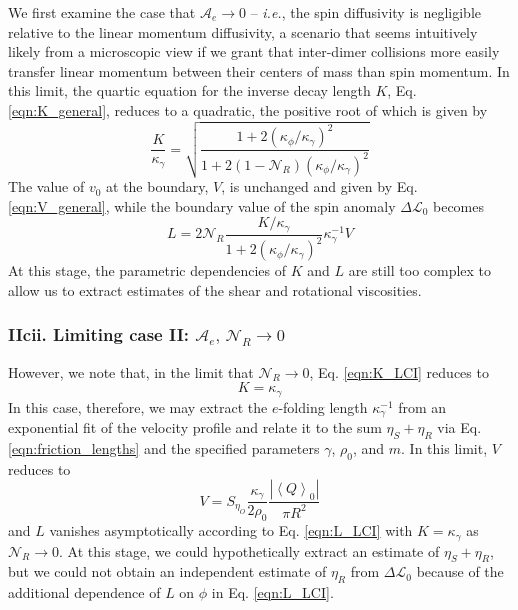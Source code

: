 \documentclass[%
 reprint,
superscriptaddress,
longbibliography,
 amsmath,amssymb,
 prl,
 citeautoscript,
]{revtex4-1}
\begin{document}
We first examine the case that $\mathcal{A}_e \longrightarrow 0$ -- {\it i.e.}, the spin diffusivity is negligible relative to the linear momentum diffusivity, a scenario that seems intuitively likely from a microscopic view if we grant that inter-dimer collisions more easily transfer linear momentum between their centers of mass than spin momentum. In this limit, the quartic equation for the inverse decay length $K$, Eq. \ref{eqn:K_general}, reduces to a quadratic, the positive root of which is given by
\begin{equation}
\frac{K}{\kappa_{\gamma}} = \sqrt{\frac{1 + 2 \left( \kappa_{\phi} / \kappa_{\gamma} \right)^2}{1 + 2 \left( 1 - \mathcal{N}_R \right) \left( \kappa_{\phi} / \kappa_{\gamma} \right)^2}}
\label{eqn:K_LCI}
\end{equation}
The value of $v_0$ at the boundary, $V$, is unchanged and given by Eq. \ref{eqn:V_general}, while the boundary value of the spin anomaly $\Delta \mathcal{L}_0$ becomes
\begin{equation}
L = 2 \mathcal{N}_R \frac{K/\kappa_{\gamma}}{1 + 2 \left( \kappa_{\phi} / \kappa_{\gamma} \right)^2} \kappa_{\gamma}^{-1} V
\label{eqn:L_LCI}
\end{equation}
At this stage, the parametric dependencies of $K$ and $L$ are still too complex to allow us to extract estimates of the shear and rotational viscosities.

\subsubsection{IIcii. Limiting case II: $\mathcal{A}_e, \, \mathcal{N}_R \rightarrow 0$}

However, we note that, in the limit that $\mathcal{N}_R \rightarrow 0$, Eq. \ref{eqn:K_LCI} reduces to
\begin{equation}
K = \kappa_{\gamma}
\label{eqn:K_LCII}
\end{equation}
In this case, therefore, we may extract the $e$-folding length $\kappa_{\gamma}^{-1}$ from an exponential fit of the velocity profile and relate it to the sum $\eta_S + \eta_R$ via Eq. \ref{eqn:friction_lengths} and the specified parameters $\gamma$, $\rho_0$, and $m$. In this limit, $V$ reduces to
\begin{equation}
V = S_{\eta_O} \frac{\kappa_{\gamma}}{2 \rho_0} \frac{\left| \left\langle Q \right\rangle_0 \right|}{\pi R^2}
\label{eqn:V_LCII}
\end{equation}
and $L$ vanishes asymptotically according to Eq. \ref{eqn:L_LCI} with $K = \kappa_{\gamma}$ as $\mathcal{N}_R \rightarrow 0$. At this stage, we could hypothetically extract an estimate of $\eta_S + \eta_R$, but we could not obtain an independent estimate of $\eta_R$ from $\Delta \mathcal{L}_0$ because of the additional dependence of $L$ on $\phi$ in Eq. \ref{eqn:L_LCI}.
\end{document}
